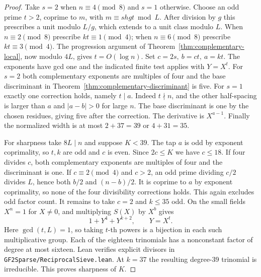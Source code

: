 \documentclass[11pt]{article}
\begin{document}
\begin{proof}
Take \(s=2\) when \(n\equiv4\pmod8\) and \(s=1\) otherwise. Choose
an odd prime \(t>2\), coprime to \(m\), with \(m\equiv shgt\bmod L\).
After division by \(g\) this prescribes a unit modulo \(L/g\),
which extends to a unit class modulo \(L\). When \(n\equiv2\pmod8\)
prescribe \(kt\equiv1\pmod4\); when \(n\equiv6\pmod8\)
prescribe \(kt\equiv3\pmod4\). The progression argument of
Theorem~\ref{thm:complementary-local}, now modulo \(4L\), gives
\(t=O(\log n)\). Set \(c=2s,\ b=ct,\ a=kt\). The exponents have gcd
one and the indicated finite test applies with \(Y=X^t\).
For \(s=2\) both complementary exponents are multiples of four
and the base discriminant in Theorem~\ref{thm:complementary-discriminant}
is five. For \(s=1\) exactly one correction holds, namely
\(t\mid a\). Indeed \(t\nmid n\), and the other half-spacing is
larger than \(a\) and \(|a-b|>0\) for large \(n\). The base
discriminant is one by the chosen residues, giving five after the
correction. The derivative is \(X^{a-1}\). Finally the normalized
width is at most \(2+37=39\) or \(4+31=35\).

For sharpness take \(8L\mid n\) and suppose \(K<39\). The tap \(a\)
is odd by exponent coprimality, so \(t,k\) are odd and \(c\) is
even. Since \(2c\le K\) we have \(c\le18\). If four divides
\(c\), both complementary exponents are multiples of four and
the discriminant is one. If \(c\equiv2\pmod4\) and \(c>2\),
an odd prime dividing \(c/2\) divides \(L\), hence both
\(b/2\) and \((n-b)/2\). It is coprime to \(a\) by exponent
coprimality, so none of the four divisibility corrections holds.
This again excludes odd factor count. It remains to take \(c=2\)
and \(k\le35\) odd. On the small fields \(X^n=1\) for \(X\ne0\),
and multiplying \(S(X)\) by \(X^b\) gives
\[
                       1+Y^4+Y^{k+2},\qquad Y=X^t .
\]
Here \(\gcd(t,L)=1\), so taking \(t\)-th powers is a bijection in
each such multiplicative group. Each of the eighteen trinomials
has a nonconstant factor of degree at most sixteen. Lean verifies
explicit divisors in \nolinkurl{GF2Sparse/ReciprocalSieve.lean}.
At \(k=37\) the resulting degree-39 trinomial is irreducible.
This proves sharpness of \(K\).
\end{proof}
\end{document}
